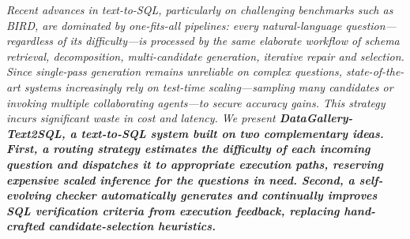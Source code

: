 \textit{
    Recent advances in text-to-SQL, particularly on challenging benchmarks such as BIRD, are dominated by one-fits-all pipelines: 
    every natural-language question—regardless of its difficulty—is processed by the same elaborate workflow of schema retrieval, 
    decomposition, multi-candidate generation, iterative repair and selection. Since single-pass generation remains unreliable on 
    complex questions, state-of-the-art systems increasingly rely on test-time scaling—sampling many candidates or invoking 
    multiple collaborating agents—to secure accuracy gains.
    This strategy incurs significant waste in cost and latency. We present \bf{DataGallery-Text2SQL}, a text-to-SQL system built on 
    two complementary ideas. 
    First, a \bf{routing strategy} estimates the difficulty of each incoming question and dispatches it to appropriate execution 
    paths, reserving expensive scaled inference for the questions in need. Second, a \bf{self-evolving checker} automatically 
    generates and continually improves SQL verification criteria from execution feedback, replacing hand-crafted candidate-selection heuristics.
}

